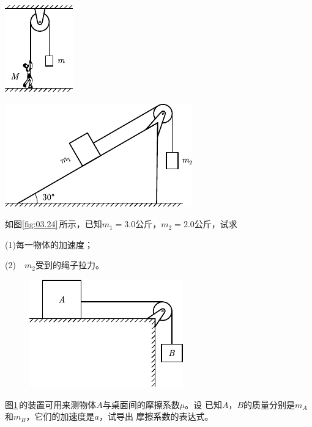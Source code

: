 \begin{exercises}
\begin{figurex}
	\begin{minipage}[b]{0.4\linewidth}
	\centering
	\includegraphics{figure/fig03.23}
	\caption{}
	\label{fig:03.23}
	\end{minipage}
	\begin{minipage}[b]{0.6\linewidth}
	\centering
	\includegraphics{figure/fig03.24}
	\caption{}
	\label{fig:03.24}
	\end{minipage}
	\vspace{-1.56em}
\end{figurex}
\exercise 如图\ref{fig:03.24}\,所示，已知$ m _ { 1 } = 3 . 0 $公斤，$ m _ { 2 } = 2 . 0 $公斤，试求

(1)每一物体的加速度；

(2)~~$ m _ { 2 } $受到的绳子拉力。

\begin{figure}
	\centering
	\includegraphics{figure/fig03.25}
	\caption{}
	\label{fig:03.25}
\end{figure}
\exercise 图\ref{fig:03.25}\,的装置可用来测物体$ A $与桌面间的摩擦系数$ \mu $。设
已知$ A $，$ B $的质量分别是$ m_A $和$ m_B $，它们的加速度是$ a $，试导出
摩擦系数的表达式。


\end{exercises}
